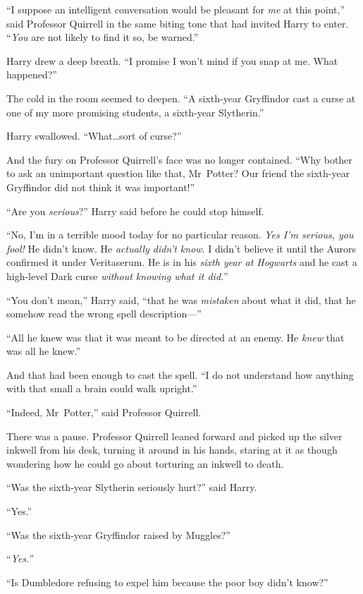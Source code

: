 “I suppose an intelligent conversation would be pleasant for \emph{me} at this point,” said Professor Quirrell in the same biting tone that had invited Harry to enter. “\emph{You} are not likely to find it so, be warned.”

Harry drew a deep breath.
“I promise I won’t mind if you snap at me. What happened?”

The cold in the room seemed to deepen.
“A sixth-year Gryffindor cast a curse at one of my more promising students, a sixth-year Slytherin.”

Harry swallowed.
“What…sort of curse?”

And the fury on Professor Quirrell’s face was no longer contained.
“Why bother to ask an unimportant question like that, Mr~Potter? Our friend the sixth-year Gryffindor did not think it was important!”

“Are you \emph{serious}?” Harry said before he could stop himself.

“No, I’m in a terrible mood today for no particular reason. \emph{Yes I’m serious, you fool!} He didn’t know. He \emph{actually didn’t know}. I didn’t believe it until the Aurors confirmed it under Veritaserum. He is in his \emph{sixth year at Hogwarts} and he cast a high-level Dark curse \emph{without knowing what it did.}”

“You don’t mean,” Harry said, “that he was \emph{mistaken} about what it did, that he somehow read the wrong spell description—”

“All he knew was that it was meant to be directed at an enemy. He \emph{knew} that was all he knew.”

And that had been enough to cast the spell.
“I do not understand how anything with that small a brain could walk upright.”

“Indeed, Mr~Potter,” said Professor Quirrell.

There was a pause. Professor Quirrell leaned forward and picked up the silver inkwell from his desk, turning it around in his hands, staring at it as though wondering how he could go about torturing an inkwell to death.

“Was the sixth-year Slytherin seriously hurt?” said Harry.

“Yes.”

“Was the sixth-year Gryffindor raised by Muggles?”

“\emph{Yes.}”

“Is Dumbledore refusing to expel him because the poor boy didn’t know?”

